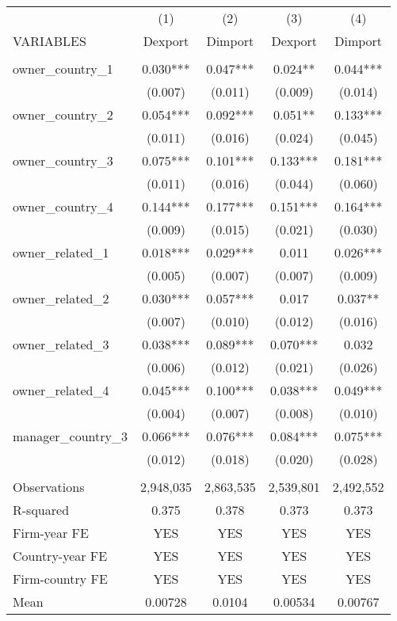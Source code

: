 \begin{tabular}{lcccc} \hline
 & (1) & (2) & (3) & (4) \\
VARIABLES & Dexport & Dimport & Dexport & Dimport \\ \hline
 &  &  &  &  \\
owner\_country\_1 & 0.030*** & 0.047*** & 0.024** & 0.044*** \\
 & (0.007) & (0.011) & (0.009) & (0.014) \\
owner\_country\_2 & 0.054*** & 0.092*** & 0.051** & 0.133*** \\
 & (0.011) & (0.016) & (0.024) & (0.045) \\
owner\_country\_3 & 0.075*** & 0.101*** & 0.133*** & 0.181*** \\
 & (0.011) & (0.016) & (0.044) & (0.060) \\
owner\_country\_4 & 0.144*** & 0.177*** & 0.151*** & 0.164*** \\
 & (0.009) & (0.015) & (0.021) & (0.030) \\
owner\_related\_1 & 0.018*** & 0.029*** & 0.011 & 0.026*** \\
 & (0.005) & (0.007) & (0.007) & (0.009) \\
owner\_related\_2 & 0.030*** & 0.057*** & 0.017 & 0.037** \\
 & (0.007) & (0.010) & (0.012) & (0.016) \\
owner\_related\_3 & 0.038*** & 0.089*** & 0.070*** & 0.032 \\
 & (0.006) & (0.012) & (0.021) & (0.026) \\
owner\_related\_4 & 0.045*** & 0.100*** & 0.038*** & 0.049*** \\
 & (0.004) & (0.007) & (0.008) & (0.010) \\
manager\_country\_3 & 0.066*** & 0.076*** & 0.084*** & 0.075*** \\
 & (0.012) & (0.018) & (0.020) & (0.028) \\
 &  &  &  &  \\
Observations & 2,948,035 & 2,863,535 & 2,539,801 & 2,492,552 \\
R-squared & 0.375 & 0.378 & 0.373 & 0.373 \\
Firm-year FE & YES & YES & YES & YES \\
Country-year FE & YES & YES & YES & YES \\
Firm-country FE & YES & YES & YES & YES \\
 Mean & 0.00728 & 0.0104 & 0.00534 & 0.00767 \\ \hline
\end{tabular}
